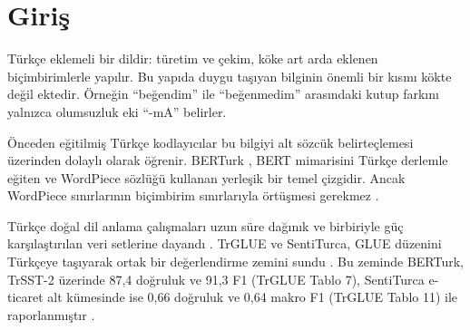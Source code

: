 \documentclass[11pt]{article}
\begin{document}
\begin{otherlanguage}{english}
\begin{abstract}
On a third task added afterwards (SentiTurca hate, four classes), our B0 reproduction already exceeds the published macro-F1 (59.83 vs. 58.0), but no architectural or ensemble component yields a significant ensemble-level gain over B0; ORK2 reaches +0.38 [$-$0.28, 1.01] macro-F1. The published 61\% accuracy lies below the 74.6\% majority-class baseline, so accuracy is not compared on this task. In a post-hoc class-imbalance analysis, class-specific decision thresholds selected on validation raise the macro-F1 of unweighted ensembles by 5.8–9.1 points. The validation-selected system, a threshold-tuned B128KL ensemble, reaches 69.08 test macro-F1 (+9.02 [7.05, 10.84] over the untuned B0 ensemble); most of this gain comes from thresholding itself (threshold-tuned B0 ensemble: +7.28), and accuracy drops by 1.70 [0.86, 2.62] points. A square-root class-weighted loss gains +6.04 [5.32, 6.76] macro-F1 at a cost of 3.81 accuracy points, whereas fully balanced weights give no significant gain and cost 12.74 accuracy points. These results are exploratory.

\end{abstract}\end{otherlanguage}

\section{Giriş}\label{sec:1}

Türkçe eklemeli bir dildir: türetim ve çekim, köke art arda eklenen biçimbirimlerle yapılır. Bu yapıda duygu taşıyan bilginin önemli bir kısmı kökte değil ektedir. Örneğin ``beğendim'' ile ``beğenmedim'' arasındaki kutup farkını yalnızca olumsuzluk eki ``-mA'' belirler.

Önceden eğitilmiş Türkçe kodlayıcılar bu bilgiyi alt sözcük belirteçlemesi üzerinden dolaylı olarak öğrenir. BERTurk \citep{schweter2020}, BERT mimarisini \citep{devlin2019} Türkçe derlemle eğiten ve WordPiece sözlüğü kullanan yerleşik bir temel çizgidir. Ancak WordPiece sınırlarının biçimbirim sınırlarıyla örtüşmesi gerekmez \citep{toraman2023,rust2021}.

Türkçe doğal dil anlama çalışmaları uzun süre dağınık ve birbiriyle güç karşılaştırılan veri setlerine dayandı \citep{safaya2022}. TrGLUE ve SentiTurca, GLUE \citep{wang2018} düzenini Türkçeye taşıyarak ortak bir değerlendirme zemini sundu \citep{altinok2025}. Bu zeminde BERTurk, TrSST-2 üzerinde 87,4 doğruluk ve 91,3 F1 (TrGLUE Tablo 7), SentiTurca e-ticaret alt kümesinde ise 0,66 doğruluk ve 0,64 makro F1 (TrGLUE Tablo 11) ile raporlanmıştır \citep{altinok2025}.
\end{document}
